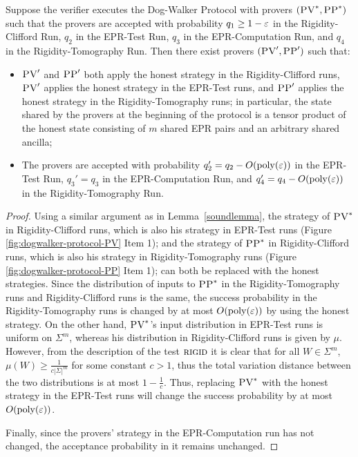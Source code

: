 \begin{lemma}\label{lem:PV-2-PP-4}
Suppose the verifier executes the Dog-Walker Protocol 
with provers $(\textsc{PV}^*,\textsc{PP}^*)$ such that the provers are accepted with probability $q_1\geq 1-\varepsilon$ in the Rigidity-Clifford Run, $q_2$ in the EPR-Test Run, $q_3$ in the EPR-Computation Run, and $q_4$ in the Rigidity-Tomography Run. Then there exist provers $(\textsc{PV}',\textsc{PP}')$ such that:
\begin{itemize}[nolistsep]
\item $\textsc{PV}'$ and $\textsc{PP}'$ both apply the honest strategy in the Rigidity-Clifford runs, $\textsc{PV}'$ applies the honest strategy in the EPR-Test runs, and $\textsc{PP}'$ applies the honest strategy in the Rigidity-Tomography runs; in particular, the state shared by the provers at the beginning of the protocol is a tensor product of the honest state consisting of $m$ shared EPR pairs and an arbitrary shared ancilla;
\item The provers are accepted with probability $q_2'=q_2-O(\mathrm{poly}(\varepsilon))$ in the EPR-Test Run, $q_3'=q_3$ in the EPR-Computation Run, and $q_4'=q_4-O(\mathrm{poly}(\varepsilon))$ in the Rigidity-Tomography Run. 
\end{itemize}
\end{lemma}

\begin{proof}
Using a similar argument as in Lemma~\ref{soundlemma}, the strategy of $\textsc{PV}^*$ in
Rigidity-Clifford runs, which is also his strategy in EPR-Test runs (Figure \ref{fig:dogwalker-protocol-PV} Item 1); and the strategy of $\textsc{PP}^*$ in Rigidity-Clifford runs, which is also his strategy in Rigidity-Tomography runs (Figure \ref{fig:dogwalker-protocol-PP} Item 1);
 can both be replaced with the honest strategies. Since the distribution of inputs to $\textsc{PP}^*$ in the Rigidity-Tomography runs and Rigidity-Clifford runs is the same, the success probability in the Rigidity-Tomography runs is changed by at most $O(\mathrm{poly}(\varepsilon))$ by using the honest strategy. 
On the other hand, $\textsc{PV}^*$'s input distribution in EPR-Test runs is uniform on $\Sigma^m$, whereas his distribution in Rigidity-Clifford runs is given by $\mu$. However, from the description of the test $\textsc{rigid}$ it is clear that for all $W\in\Sigma^m$, $\mu(W)\geq \frac{1}{c|\Sigma|^m}$ for some constant $c>1$, thus the total variation distance between the two distributions is at most $1-\frac{1}{c}$. Thus, replacing $\textsc{PV}^*$ with the honest strategy in the EPR-Test  runs will change the success probability by at most  $O(\mathrm{poly}(\varepsilon))$. 

Finally, since the provers' strategy in the EPR-Computation run has not changed, the
  acceptance probability in it remains unchanged.
\end{proof}

